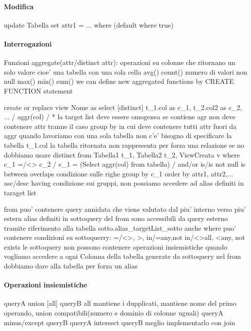 \documentclass[12pt]{article}
\begin{document}
\paragraph{Modifica}
			update Tabella
			set attr1 = ...
			where (default where true)
\paragraph{Interrogazioni}
			Funzioni aggregate(attr/distinct attr): operazioni su colonne che ritornano un solo valore cioe' una tabella con una sola cella
				avg()
				count() numero di valori non null
				max()
				min()
				sum()
				we can define new aggregated functions by CREATE FUNCTION statement
				
			create or replace view Nome as
				select [distinct] t_1.col as c_1, t_2.col2 as c_2, ... / aggr(col) / *    
					la target list deve essere omogenea se contiene agr non deve contenere attr tranne il caso group by in cui deve contenere tutti attr fuori da aggr
					quando lavoriamo con una sola tabella non c'e' bisogno di specificare la tabella t_1.col 
					la tabella ritornata non rappresenta per forza una relazione se no dobbiamo usare distinct
				from Tabella1 t_1, Tabella2 t_2, ViewCreata v
				where c_1 =/<> c_2 / c_1 = (Select aggr(col) from tabella) / and/or  is/is not null   is between  overlaps   condizione sulle righe	
				group by c_1
				order by attr1, attr2,... asc/desc
				having condizione sui gruppi, non possiamo accedere ad alias definiti in taraget list

			from puo' contenere query annidata che viene valutato dal piu' interno verso piu' estern
			alias definiti in sottoquery del from sono accessibili da query esterno tramite riferimento alla tabella sotto.alias_targetList_sotto
			anche where puo' contenere condizioni su sottoquerry: =/<>, >, in/=any,not in/<>all, <any, not exists
			le sottoquery non possono contenere operazioni insiemistiche
			quando vogliamo accedere a ogni Colonna della tabella generate da sottoquery nel from dobbiamo dare alla tabella per forza un alias
 
\paragraph{Operazioni insiemistiche}
			queryA union [all] queryB        all mantiene i dupplicati, mantiene nome del primo operando, union compatibili(numero e dominio di colonne uguali) 
			queryA minus/except queryB
			queryA intersect queryB    meglio implementarlo con join
		
\end{document}
